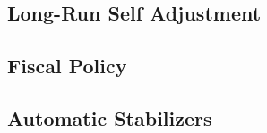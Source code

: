 \documentclass[8pt]{beamer}
\begin{document}
  \begin{frame}
	\section{Long-Run Self Adjustment}
  \end{frame}
  \begin{frame}
	\section{Fiscal Policy}
  \end{frame}
  \begin{frame}
	\section{Automatic Stabilizers}
  \end{frame}
\end{document}
